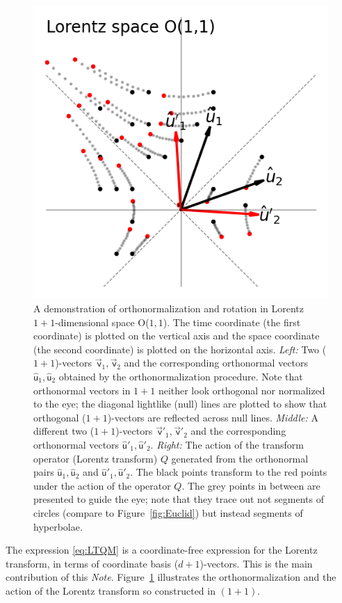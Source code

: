 \documentclass{article}
\newcommand\upvec[1]{\!\vec{\,\mathrm{#1}}}
\newcommand{\Lvec}[1]{\upvec{\mathsf{#1}}} %
\newcommand{\Lhat}[1]{\hat{\mathsf{#1}}} %
\newcommand{\plus}{\!+\!} %
\newcommand{\documentname}{\textsl{Note}}
\newcommand{\figref}[1]{Figure~\ref{#1}}
\newlength{\figurewidth}
\begin{document}
\begin{figure}[t]
\begin{mdframed}
\includegraphics[width=\figurewidth]{L_Q.png}
\caption{A demonstration of orthonormalization and rotation in Lorentz $1\plus1$-dimensional space O($1,1$).
The time coordinate (the first coordinate) is plotted on the vertical axis and the space coordinate (the second coordinate) is plotted on the horizontal axis.
\textsl{Left:} Two ($1\plus1$)-vectors $\Lvec{v}_1, \Lvec{v}_2$ and the corresponding orthonormal vectors $\Lhat{u}_1, \Lhat{u}_2$ obtained by the orthonormalization procedure.
Note that orthonormal vectors in $1\plus1$ neither look orthogonal nor normalized to the eye; the diagonal lightlike (null) lines are plotted to show that orthogonal ($1\plus1$)-vectors are reflected across null lines.
\textsl{Middle:} A different two ($1\plus1$)-vectors $\Lvec{v}'_1, \Lvec{v}'_2$ and the corresponding orthonormal vectors $\Lhat{u}'_1, \Lhat{u}'_2$.
\textsl{Right:} The action of the transform operator (Lorentz transform) $Q$ generated from the orthonormal pairs $\Lhat{u}_1, \Lhat{u}_2$ and $\Lhat{u}'_1, \Lhat{u}'_2$.
The black points transform to the red points under the action of the operator $Q$.
The grey points in between are presented to guide the eye; 
note that they trace out not segments of circles (compare to \figref{fig:Euclid}) but instead segments of hyperbolae.\label{fig:Lorentz}}
\end{mdframed}
\end{figure}
The expression \eqref{eq:LTQM} is a coordinate-free expression for the Lorentz transform, in terms of coordinate basis ($d\plus1$)-vectors.
This is the main contribution of this \documentname.
\figref{fig:Lorentz} illustrates the orthonormalization and the action of the Lorentz transform so constructed in $(1\plus1)$.
\end{document}
